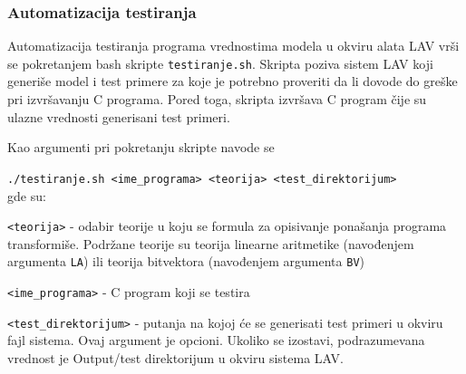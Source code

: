 \documentclass[12pt,oneside]{memoir}
\begin{document}
\subsubsection{Automatizacija testiranja}
Automatizacija testiranja programa vrednostima modela u okviru alata LAV vrši se pokretanjem bash skripte \texttt{testiranje.sh}. Skripta poziva sistem LAV koji generiše model i test primere za koje je potrebno proveriti da li dovode do greške pri izvršavanju C programa. Pored toga, skripta izvršava C program čije su ulazne vrednosti generisani test primeri.

Kao argumenti pri pokretanju skripte navode se 
\par
\texttt{./testiranje.sh <ime\_programa> <teorija> <test\_direktorijum>}
\\ gde su:
\begin{description}
   \item \texttt{<teorija>} - odabir teorije u koju se formula za opisivanje ponašanja programa transformiše. Podržane teorije su teorija linearne aritmetike (navođenjem argumenta \texttt{LA}) ili teorija bitvektora (navođenjem argumenta \texttt{BV})
  \item \texttt{<ime\_programa>} - C program koji se testira
  \item \texttt{<test\_direktorijum>} - putanja na kojoj će se generisati test primeri u okviru fajl sistema. Ovaj argument je opcioni. Ukoliko se izostavi, podrazumevana vrednost je Output/test direktorijum u okviru sistema LAV.
\end{description}
 
\end{document}
